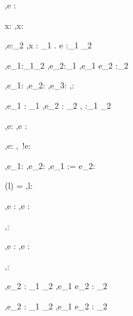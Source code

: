 



  {\Gamma,\Sigma \infers e : \tau}


  {x:\tau\in\Gamma}
  {\Gamma,\Sigma\infers x:\tau}


  {\Gamma[x:\tau_1] ,\Sigma \infers e:\tau_2}
  {\Gamma,\Sigma \infers \lambda x : \tau_1 . e :\tau_1 \to \tau_2}

  {\Gamma,\Sigma \infers e_1:\tau_1\to\tau_2 \Quad
   \Gamma,\Sigma \infers e_2:\tau_1}
  {\Gamma,\Sigma \infers e_1 e_2 :\tau_2}


  {\Gamma,\Sigma \infers e_1:\Bool \Quad
   \Gamma,\Sigma \infers e_2:\tau \Quad
   \Gamma,\Sigma \infers e_3:\tau}
  {\Gamma,\Sigma \infers {}:\tau}


    {\Gamma,\Sigma \infers e_1 : \tau_1  \Quad
     \Gamma,\Sigma \infers e_2 : \tau_2}
    {\Gamma,\Sigma \infers {} :\tau_1 \times \tau_2}


  {\Gamma,\Sigma \infers e:\beta}
  {\Gamma,\Sigma \infers \Ref e :\Reference \beta}

  {\Gamma,\Sigma \infers e:\Reference \beta}
  {\Gamma,\Sigma\infers\ !e:\beta}

  {\Gamma,\Sigma\infers e_1:\Reference \beta \Quad
   \Gamma,\Sigma\infers e_2:\beta}
  {\Gamma,\Sigma\infers e_1 := e_2:\Unit}

  {\Sigma(l) = \beta}
  {\Gamma,\Sigma\infers l:\Reference \beta}


  {\Gamma,\Sigma \infers e : \tau}
  {\Gamma,\Sigma \infers \Edit e : \Task \tau}

  {}
  {\Gamma,\Sigma \infers \Enter \tau : \Task \tau}

  {\Gamma,\Sigma \infers e : \Reference \beta}
  {\Gamma,\Sigma \infers \Update e : \Task \beta}


  {}
  {\Gamma,\Sigma \infers \Fail : \Task \tau}


  {
   {\Gamma,\Sigma \infers e_2 : \tau_1 \to \Task \tau_2}}
  {\Gamma,\Sigma \infers e_1 \Then e_2 : \Task \tau_2}


  {
   {\Gamma,\Sigma \infers e_2 : \tau_1 \to \Task \tau_2}}
  {\Gamma,\Sigma \infers e_1 \Next e_2 : \Task \tau_2}



